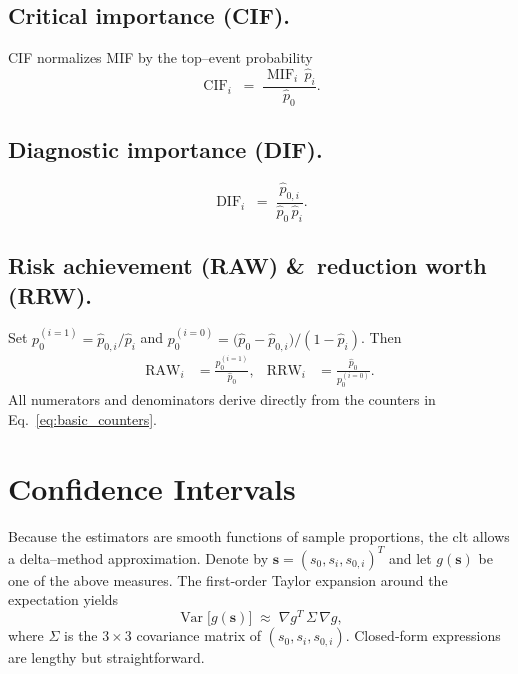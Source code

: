 \subsection{Critical importance (CIF).}
CIF normalizes MIF by the top–event probability
\begin{equation}
\operatorname{CIF}_i \;=\; \frac{\operatorname{MIF}_i\,\widehat{p}_i}
                                     {\widehat{p}_0}.
\label{eq:cif_estimator}
\end{equation}
\subsection{Diagnostic importance (DIF).}
\begin{equation}
\operatorname{DIF}_i \;=\;
   \frac{\widehat{p}_{0,i}}{\widehat{p}_0\,\widehat{p}_i}.
\label{eq:dif_estimator}   
\end{equation}   
\subsection{Risk achievement (RAW) \&\ reduction worth (RRW).}
Set $p_0^{(i=1)} = \widehat{p}_{0,i}/\widehat{p}_i$ and
$p_0^{(i=0)} = \bigl(\widehat{p}_0 - \widehat{p}_{0,i}\bigr)/(1-\widehat{p}_i)$.
Then
\begin{align}
  \operatorname{RAW}_i &= \frac{p_0^{(i=1)}}{\widehat{p}_0}, &
  \operatorname{RRW}_i &= \frac{\widehat{p}_0}{p_0^{(i=0)}}.
  \label{eq:rrw_estimator}
\end{align}
All numerators and denominators derive directly from the counters in
Eq.~\eqref{eq:basic_counters}.

\section{Confidence Intervals}
Because the estimators are smooth functions of sample proportions, the \acrshort{clt}
allows a delta–method approximation.  Denote by $\boldsymbol{s}=(s_0,s_i,s_{0,i})^T$ and
let $g(\boldsymbol{s})$ be one of the above measures.
The first‐order Taylor expansion around the expectation yields
\[
  \operatorname{Var}\bigl[g(\boldsymbol{s})\bigr]
  \;\approx\;
  \nabla g^T \!\,\Sigma\, \nabla g,
\]
where $\Sigma$ is the $3\!\times\!3$ covariance matrix of $(s_0,s_i,s_{0,i})$.
Closed‐form expressions are lengthy but straightforward.

